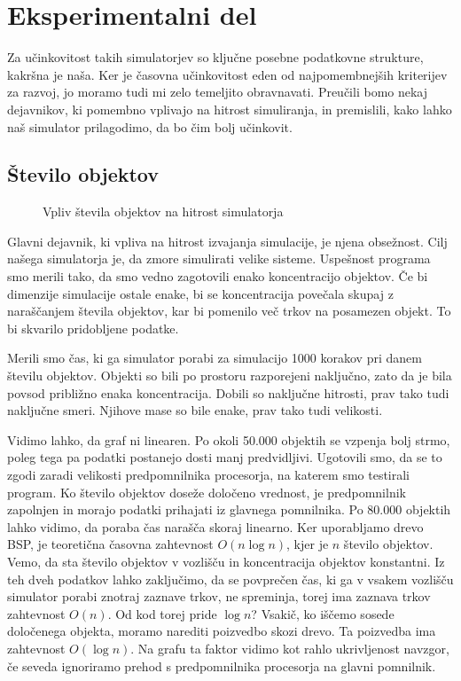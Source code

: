 \documentclass[a4paper,12pt]{article}
\begin{document}
\section{Eksperimentalni del}

Za učinkovitost takih simulatorjev so ključne posebne podatkovne strukture, kakršna je naša.
Ker je časovna učinkovitost eden od najpomembnejših kriterijev za razvoj, jo moramo tudi mi zelo temeljito
obravnavati. Preučili bomo nekaj dejavnikov, ki pomembno vplivajo na hitrost simuliranja,
in premislili, kako lahko naš simulator prilagodimo, da bo čim bolj učinkovit. 

\subsection{Število objektov}

\begin{wrapfigure}{r}{0.5\textwidth}
    \caption{Vpliv števila objektov na hitrost simulatorja}
\end{wrapfigure}

Glavni dejavnik, ki vpliva na hitrost izvajanja simulacije, je njena obsežnost. Cilj našega simulatorja je,
da zmore simulirati velike sisteme. Uspešnost programa smo merili tako, da smo vedno zagotovili enako
koncentracijo objektov. Če bi dimenzije simulacije ostale enake, bi se koncentracija povečala skupaj
z naraščanjem števila objektov, kar bi pomenilo več trkov na posamezen objekt. To bi skvarilo pridobljene podatke. 

Merili smo čas, ki ga simulator porabi za simulacijo 1000 korakov pri danem številu objektov.
Objekti so bili po prostoru razporejeni naključno, zato da je bila povsod približno enaka koncentracija. Dobili so
naključne hitrosti, prav tako tudi naključne smeri. Njihove mase so bile enake, prav tako tudi velikosti. 

Vidimo lahko, da graf ni linearen. Po okoli 50.000 objektih se vzpenja bolj strmo, poleg tega pa podatki
postanejo dosti manj predvidljivi. Ugotovili smo, da se to zgodi zaradi velikosti predpomnilnika procesorja, na
katerem smo testirali program. Ko število objektov doseže določeno vrednost, je predpomnilnik zapolnjen in
morajo podatki prihajati iz glavnega pomnilnika. Po 80.000 objektih lahko vidimo, da poraba čas narašča skoraj linearno.
Ker uporabljamo drevo BSP, je teoretična časovna zahtevnost $O(n \log n)$, kjer je $n$ število objektov.
Vemo, da sta število objektov v vozlišču in koncentracija objektov konstantni. Iz teh dveh podatkov
lahko zaključimo, da se povprečen čas, ki ga v vsakem vozlišču simulator porabi znotraj zaznave trkov, ne spreminja,
torej ima zaznava trkov zahtevnost $O(n)$. Od kod torej pride $\log n$?
Vsakič, ko iščemo sosede določenega objekta, moramo narediti poizvedbo skozi drevo. Ta poizvedba ima zahtevnost $O(\log n)$. 
Na grafu ta faktor vidimo kot rahlo ukrivljenost navzgor, če seveda ignoriramo prehod s predpomnilnika procesorja na glavni pomnilnik.
\end{document}
